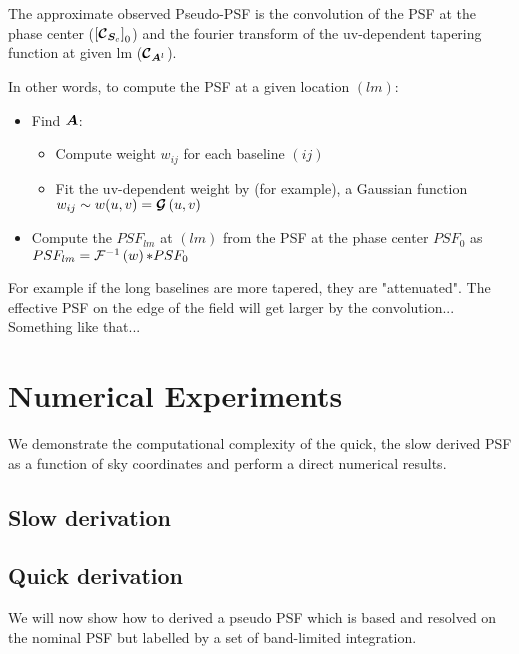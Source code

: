 The approximate observed Pseudo-PSF is the convolution of the PSF at
the phase center ($\left[\bm{\mathcal{C}}_{\bm{S}_{c}}\right]_0$) and the fourier transform of the uv-dependent tapering function at given
lm ($\bm{\mathcal{C}}_{\bm{A}^l}$).

In other words, to compute the PSF at a given location $(lm)$:

\begin{itemize}
  \item Find $\bm{A}$:
    \begin{itemize}
    \item Compute weight $w_{ij}$ for each baseline $(ij)$
    \item Fit the uv-dependent weight by (for example), a Gaussian function $w_{ij}\sim w(u,v)=\bm{\mathcal{G}}\left(u,v\right)$ 
    \end{itemize}
  \item Compute the $PSF_{lm}$ at $(lm)$ from the PSF at the phase center $PSF_0$ as $PSF_{lm}=\mathcal{F}^{-1}\left(w\right)\mathcal{*} PSF_0$
\end{itemize}
For example if the long baselines are more tapered, they are
"attenuated". The effective PSF on the edge of the field will get
larger by the convolution...
Something like that...
\section{Numerical Experiments}
We demonstrate the computational complexity of the quick, the slow derived PSF as a function of sky coordinates and 
perform a direct numerical results.
\subsection{Slow derivation}
\subsection{Quick derivation}
We will now show how to derived a pseudo PSF  which is based and resolved on the nominal PSF
but labelled by a set of band-limited integration.
